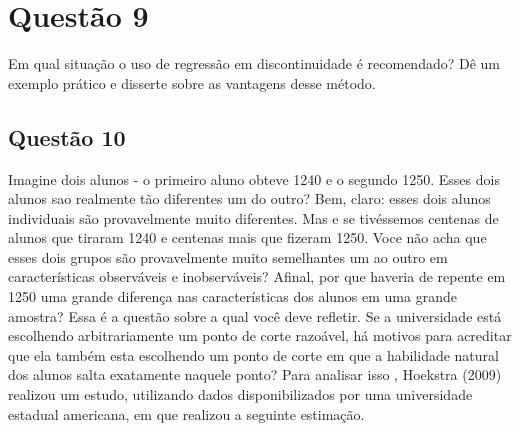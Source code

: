 \documentclass[
]{article}
\begin{document}
\hypertarget{questuxe3o-9}{%
\section{Questão 9}\label{questuxe3o-9}}

Em qual situação o uso de regressão em discontinuidade é recomendado? Dê
um exemplo prático e disserte sobre as vantagens desse método.

\hypertarget{questuxe3o-10}{%
\subsection{Questão 10}\label{questuxe3o-10}}

Imagine dois alunos - o primeiro aluno obteve 1240 e o segundo 1250.
Esses dois alunos sao realmente tão diferentes um do outro? Bem, claro:
esses dois alunos individuais são provavelmente muito diferentes. Mas e
se tivéssemos centenas de alunos que tiraram 1240 e centenas mais que
fizeram 1250. Voce não acha que esses dois grupos são provavelmente
muito semelhantes um ao outro em características observáveis e
inobserváveis? Afinal, por que haveria de repente em 1250 uma grande
diferença nas características dos alunos em uma grande amostra? Essa é a
questão sobre a qual você deve refletir. Se a universidade está
escolhendo arbitrariamente um ponto de corte razoável, há motivos para
acreditar que ela também esta escolhendo um ponto de corte em que a
habilidade natural dos alunos salta exatamente naquele ponto? Para
analisar isso , Hoekstra (2009) realizou um estudo, utilizando dados
disponibilizados por uma universidade estadual americana, em que
realizou a seguinte estimação.
\end{document}
